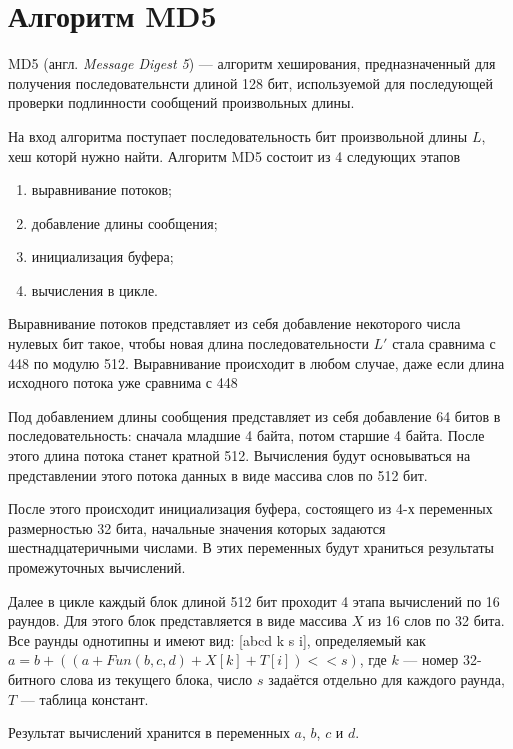 \section{Алгоритм MD5}

MD5 (англ. \textit{Message Digest 5}) --- алгоритм хеширования, предназначенный для получения последовательнсти длиной 128 бит, используемой для последующей проверки подлинности сообщений произвольных длины.

На вход алгоритма поступает последовательность бит произвольной длины $L$, хеш которй нужно найти. 
Алгоритм MD5 состоит из 4 следующих этапов
\begin{enumerate}[label=\arabic*)]
	\item выравнивание потоков;
	\item добавление длины сообщения;
	\item инициализация буфера;
	\item вычисления в цикле.
\end{enumerate}

Выравнивание потоков представляет из себя добавление некоторого числа нулевых бит такое, чтобы новая длина последовательности $L'$ стала сравнима с 448 по модулю 512. Выравнивание происходит в любом случае, даже если длина исходного потока уже сравнима с 448

Под добавлением длины сообщения представляет из себя добавление 64 битов в последовательность: сначала младшие 4 байта, потом старшие 4 байта. После этого длина потока станет кратной 512. Вычисления будут основываться на представлении этого потока данных в виде массива слов по 512 бит.

После этого происходит инициализация буфера, состоящего из 4-х переменных размерностью 32 бита, начальные значения которых задаются шестнадцатеричными числами.
В этих переменных будут храниться результаты промежуточных вычислений.

Далее в цикле каждый блок длиной 512 бит проходит 4 этапа вычислений по 16 раундов. Для этого блок представляется в виде массива $X$ из 16 слов по 32 бита.
Все раунды однотипны и имеют вид: [abcd k s i], определяемый как $a = b + ((a +Fun(b, c,d) + X[k] + T[i]	) << s)$, где $k$ --- номер 32-битного слова из текущего блока, число $s$ задаётся отдельно для каждого раунда, $T$ --- таблица констант.

Результат вычислений хранится в переменных  $a$, $b$, $c$ и $d$.
